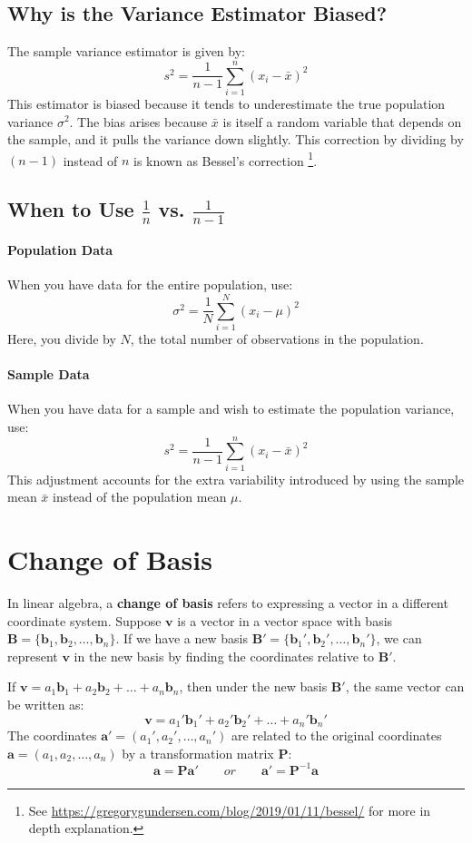 \documentclass[]{article}
\begin{document}
	\subsection{Why is the Variance Estimator Biased?}
	The sample variance estimator is given by:
	$$
	s^2 = \frac{1}{n-1} \sum_{i=1}^n (x_i - \bar{x})^2
	$$
	This estimator is biased because it tends to underestimate the true population variance $\sigma^2$.
	The bias arises because $\bar{x}$ is itself a random variable that depends on the sample, and it pulls the variance down slightly.
	This correction by dividing by $(n-1)$ instead of $n$ is known as Bessel's correction \footnote{See \url{https://gregorygundersen.com/blog/2019/01/11/bessel/} for more in depth explanation.}.
	
	\subsection{When to Use $\frac{1}{n}$ vs. $\frac{1}{n-1}$}
	\paragraph{Population Data}
	When you have data for the entire population, use:
	$$
	\sigma^2 = \frac{1}{N} \sum_{i=1}^N (x_i - \mu)^2
	$$
	Here, you divide by $N$, the total number of observations in the population.
	
	\paragraph{Sample Data}
	When you have data for a sample and wish to estimate the population variance, use:
	$$
	s^2 = \frac{1}{n-1} \sum_{i=1}^n (x_i - \bar{x})^2
	$$
	This adjustment accounts for the extra variability introduced by using the sample mean $\bar{x}$ instead of the population mean $\mu$.
	
	\section{Change of Basis}
	In linear algebra, a \textbf{change of basis} refers to expressing a vector in a different coordinate system.
	Suppose $\mathbf{v}$ is a vector in a vector space with basis $\mathbf{B} = \{\mathbf{b}_1, \mathbf{b}_2, \dots, \mathbf{b}_n\}$.
	If we have a new basis $\mathbf{B}' = \{\mathbf{b}_1', \mathbf{b}_2', \dots, \mathbf{b}_n'\}$, we can represent $\mathbf{v}$ in the new basis by finding the coordinates relative to $\mathbf{B}'$.
	
	If $\mathbf{v} = a_1 \mathbf{b}_1 + a_2 \mathbf{b}_2 + \dots + a_n \mathbf{b}_n$, then under the new basis $\mathbf{B}'$, the same vector can be written as:
	$$
	\mathbf{v} = a_1' \mathbf{b}_1' + a_2' \mathbf{b}_2' + \dots + a_n' \mathbf{b}_n'
	$$
	The coordinates $\mathbf{a'} = (a_1', a_2', \dots, a_n')$ are related to the original coordinates $\mathbf{a} = (a_1, a_2, \dots, a_n)$ by a transformation matrix $\mathbf{P}$:
	$$
	\mathbf{a} = \mathbf{P} \mathbf{a'}
	\qquad \textit{or} \qquad
	\mathbf{a'} = \mathbf{P}^{-1} \mathbf{a}
	$$
	
\end{document}
